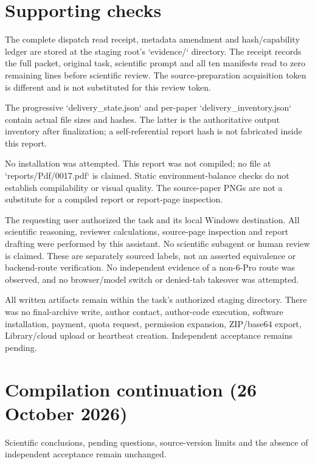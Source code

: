 \documentclass[10pt]{article}
\begin{document}
\section*{Supporting checks}
The complete dispatch read receipt, metadata amendment and hash/capability ledger are stored at the staging root’s `evidence/` directory. The receipt records the full packet, original task, scientific prompt and all ten manifests read to zero remaining lines before scientific review. The source-preparation acquisition token is different and is not substituted for this review token.\par
The progressive `delivery\_state.json` and per-paper `delivery\_inventory.json` contain actual file sizes and hashes. The latter is the authoritative output inventory after finalization; a self-referential report hash is not fabricated inside this report.\par
No installation was attempted. This report was not compiled; no file at `reports/Pdf/0017.pdf` is claimed. Static environment-balance checks do not establish compilability or visual quality. The source-paper PNGs are not a substitute for a compiled report or report-page inspection.\par
The requesting user authorized the task and its local Windows destination. All scientific reasoning, reviewer calculations, source-page inspection and report drafting were performed by this assistant. No scientific subagent or human review is claimed. These are separately sourced labels, not an asserted equivalence or backend-route verification. No independent evidence of a non-6-Pro route was observed, and no browser/model switch or denied-tab takeover was attempted.\par
All written artifacts remain within the task’s authorized staging directory. There was no final-archive write, author contact, author-code execution, software installation, payment, quota request, permission expansion, ZIP/base64 export, Library/cloud upload or heartbeat creation. Independent acceptance remains pending.\par
\section*{Compilation continuation (26 October 2026)}
Scientific conclusions, pending questions, source-version limits and the absence of independent acceptance remain unchanged.\par
\end{document}
